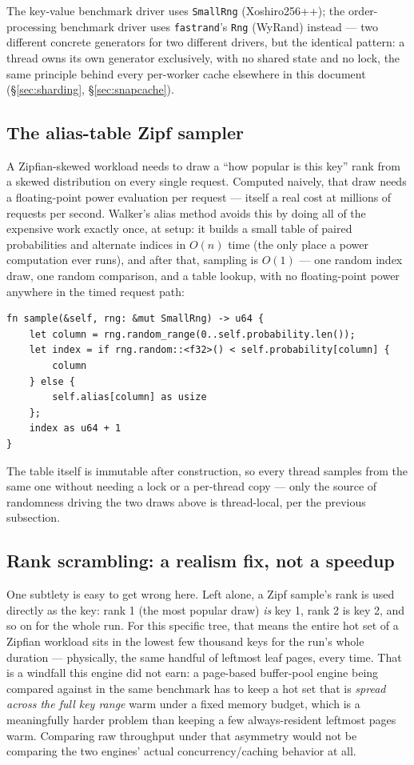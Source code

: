 \documentclass[11pt]{article}
\newcommand{\code}[1]{\texttt{#1}}
\begin{document}
The key-value benchmark driver uses \code{SmallRng} (Xoshiro256++); the
order-processing benchmark driver uses \code{fastrand}'s \code{Rng} (WyRand) instead
--- two different concrete generators for two different drivers, but the identical
pattern: a thread owns its own generator exclusively, with no shared state and no
lock, the same principle behind every per-worker cache elsewhere in this document
(\S\ref{sec:sharding}, \S\ref{sec:snapcache}).

\subsection{The alias-table Zipf sampler}

A Zipfian-skewed workload needs to draw a ``how popular is this key'' rank from a
skewed distribution on every single request. Computed naively, that draw needs a
floating-point power evaluation per request --- itself a real cost at millions of
requests per second. Walker's alias method avoids this by doing all of the expensive
work exactly once, at setup: it builds a small table of paired probabilities and
alternate indices in $O(n)$ time (the only place a power computation ever runs), and
after that, sampling is $O(1)$ --- one random index draw, one random comparison, and
a table lookup, with no floating-point power anywhere in the timed request path:

\begin{lstlisting}
fn sample(&self, rng: &mut SmallRng) -> u64 {
    let column = rng.random_range(0..self.probability.len());
    let index = if rng.random::<f32>() < self.probability[column] {
        column
    } else {
        self.alias[column] as usize
    };
    index as u64 + 1
}
\end{lstlisting}

The table itself is immutable after construction, so every thread samples from the
same one without needing a lock or a per-thread copy --- only the source of
randomness driving the two draws above is thread-local, per the previous subsection.

\subsection{Rank scrambling: a realism fix, not a speedup}

One subtlety is easy to get wrong here. Left alone, a Zipf sample's rank is used
directly as the key: rank 1 (the most popular draw) \emph{is} key 1, rank 2 is key
2, and so on for the whole run. For this specific tree, that means the entire hot
set of a Zipfian workload sits in the lowest few thousand keys for the run's whole
duration --- physically, the same handful of leftmost leaf pages, every time. That
is a windfall this engine did not earn: a page-based buffer-pool engine being
compared against in the same benchmark has to keep a hot set that is \emph{spread
across the full key range} warm under a fixed memory budget, which is a
meaningfully harder problem than keeping a few always-resident leftmost pages warm.
Comparing raw throughput under that asymmetry would not be comparing the two
engines' actual concurrency/caching behavior at all.
\end{document}
